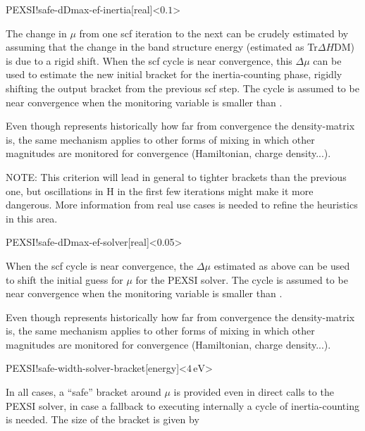 \begin{fdfentry}{PEXSI!safe-dDmax-ef-inertia}[real]<$0.1$>

  The change in $\mu$ from one scf iteration to the next can be
  crudely estimated by assuming that the change in the band structure
  energy (estimated as Tr$\Delta H$DM) is due to a rigid shift.  When
  the scf cycle is near convergence, this $\Delta\mu$ can be used to
  estimate the new initial bracket for the inertia-counting phase,
  rigidly shifting the output bracket from the previous scf step.  The
  cycle is assumed to be near convergence when the monitoring variable
   is smaller than .

  \note Even though  represents historically how far from
  convergence the density-matrix is, the same mechanism applies to
  other forms of mixing in which other magnitudes are monitored for
  convergence (Hamiltonian, charge density...).

  NOTE: This criterion will lead in general to tighter brackets than
  the previous one, but oscillations in H in the first few iterations
  might make it more dangerous. More information from real use cases
  is needed to refine the heuristics in this area.

\end{fdfentry}

\begin{fdfentry}{PEXSI!safe-dDmax-ef-solver}[real]<0.05>
  
  When the scf cycle is near convergence, the $\Delta\mu$ estimated as
  above can be used to shift the initial guess for $\mu$ for the PEXSI
  solver.  The cycle is assumed to be near convergence when the
  monitoring variable  is smaller than .

  \note Even though  represents historically how far from
  convergence the density-matrix is, the same mechanism applies to
  other forms of mixing in which other magnitudes are monitored for
  convergence (Hamiltonian, charge density...).

\end{fdfentry}

\begin{fdfentry}{PEXSI!safe-width-solver-bracket}[energy]<$4\,\mathrm{eV}$>

  In all cases, a ``safe'' bracket around $\mu$ is provided even in
  direct calls to the PEXSI solver, in case a fallback to executing
  internally a cycle of inertia-counting is needed. The size of the
  bracket is given by 

\end{fdfentry}

